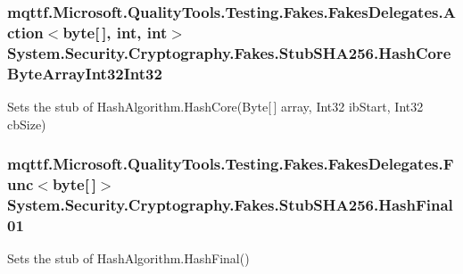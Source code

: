 \hypertarget{class_system_1_1_security_1_1_cryptography_1_1_fakes_1_1_stub_s_h_a256_a4e812e12d7537a14cf2c2229e837adbd}{
\subsubsection[{Hash\-Core\-Byte\-Array\-Int32\-Int32}]{\setlength{\rightskip}{0pt plus 5cm}mqttf.\-Microsoft.\-Quality\-Tools.\-Testing.\-Fakes.\-Fakes\-Delegates.\-Action$<$byte\mbox{[}$\,$\mbox{]}, int, int$>$ System.\-Security.\-Cryptography.\-Fakes.\-Stub\-S\-H\-A256.\-Hash\-Core\-Byte\-Array\-Int32\-Int32}}\label{class_system_1_1_security_1_1_cryptography_1_1_fakes_1_1_stub_s_h_a256_a4e812e12d7537a14cf2c2229e837adbd}


Sets the stub of Hash\-Algorithm.\-Hash\-Core(\-Byte\mbox{[}$\,$\mbox{]} array, Int32 ib\-Start, Int32 cb\-Size)

\hypertarget{class_system_1_1_security_1_1_cryptography_1_1_fakes_1_1_stub_s_h_a256_a426d889c4278f24a41e68db963450178}{
\subsubsection[{Hash\-Final01}]{\setlength{\rightskip}{0pt plus 5cm}mqttf.\-Microsoft.\-Quality\-Tools.\-Testing.\-Fakes.\-Fakes\-Delegates.\-Func$<$byte\mbox{[}$\,$\mbox{]}$>$ System.\-Security.\-Cryptography.\-Fakes.\-Stub\-S\-H\-A256.\-Hash\-Final01}}\label{class_system_1_1_security_1_1_cryptography_1_1_fakes_1_1_stub_s_h_a256_a426d889c4278f24a41e68db963450178}


Sets the stub of Hash\-Algorithm.\-Hash\-Final()

